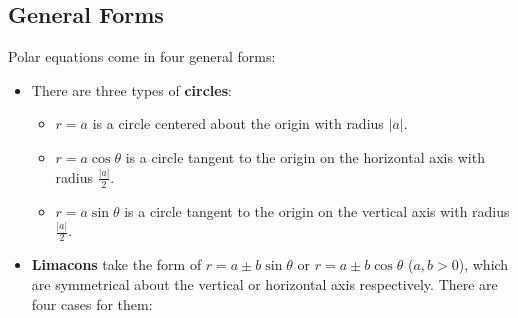 \documentclass[../AP_Calculus]{subfiles}
\begin{document}
		\subsection{General Forms}
			Polar equations come in four general forms:
			\begin{itemize}
				\item There are three types of \textbf{circles}:
					\begin{itemize}
						\item $r = a$ is a circle centered about the origin with radius $|a|$.
							\begin{center}
							\end{center}
						\item $r = a\cos\theta$ is a circle tangent to the origin on the horizontal axis with radius $\frac{|a|}{2}$.
							\begin{center}
							\end{center}
						\item $r = a\sin\theta$ is a circle tangent to the origin on the vertical axis with radius $\frac{|a|}{2}$.
							\begin{center}
							\end{center}
					\end{itemize}
				\item \textbf{Limacons} take the form of $r = a\pm b\sin\theta$ or $r = a\pm b\cos\theta$ ($a, b > 0$), which are symmetrical about the vertical or horizontal axis respectively. There are four cases for them:

\end{itemize}
\end{document}
